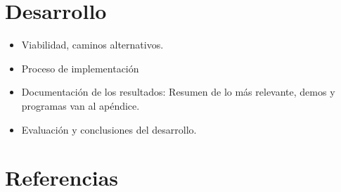 \section{Desarrollo}
\begin{itemize}
	\item Viabilidad, caminos alternativos.
	\item Proceso de implementación
	\item Documentación de los resultados: Resumen de lo más relevante, demos y programas van al apéndice.
	\item Evaluación y conclusiones del desarrollo.
\end{itemize}

\section{Referencias}

